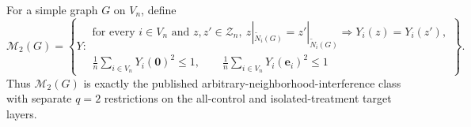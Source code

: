 For a simple graph \(G\) on \(V_n\), define
\[
\mathcal M_2(G)=\left\{Y:\begin{array}{l}
\text{for every }i\in V_n\text{ and }z,z'\in\mathcal Z_n,
\ z|_{\widetilde N_i(G)}=z'|_{\widetilde N_i(G)}\Rightarrow Y_i(z)=Y_i(z'),\\[2mm]
\displaystyle \frac1n\sum_{i\in V_n}Y_i(\mathbf 0)^2\leq1,
\qquad
\displaystyle \frac1n\sum_{i\in V_n}Y_i(\mathbf e_i)^2\leq1
\end{array}\right\}.
\]
Thus \(\mathcal M_2(G)\) is exactly the published arbitrary-neighborhood-interference class with separate \(q=2\) restrictions on the all-control and isolated-treatment target layers.